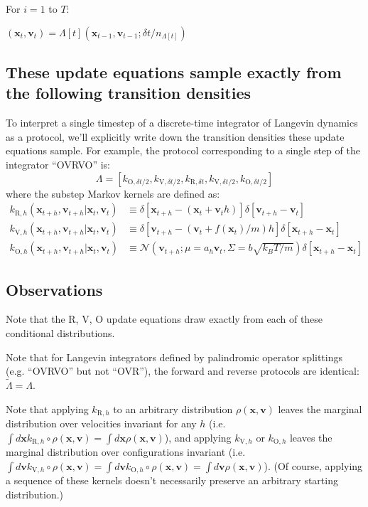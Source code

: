 \documentclass[11pt]{article}
\newcommand{\x}{\mathbf{x}}
\newcommand{\vel}{\mathbf{v}}
\begin{document}
For $i=1$ to $T$:

$(\x_t, \vel_t) = \Lambda[t](\x_{t-1}, \vel_{t-1} ; \delta t / n_{\Lambda[t]}) $

\subsection{These update equations sample exactly from the following transition densities}
To interpret a single timestep of a discrete-time integrator of Langevin dynamics as a protocol, we'll explicitly write down the transition densities these update equations sample.
For example, the protocol corresponding to a single step of the integrator ``OVRVO'' is:
$$\Lambda = [k_{\text{O}, \delta t / 2},
k_{\text{V}, \delta t / 2},
k_{\text{R}, \delta t},
k_{\text{V}, \delta t / 2},
k_{\text{O}, \delta t / 2}]$$
where the substep Markov kernels are defined as:
$$\begin{aligned}
k_{\text{R}, h}(\x_{t+h}, \vel_{t+h} | \x_t, \vel_t) &\equiv  \delta[ \x_{t+h} - (\x_t + \vel_t h)] \delta [\vel_{t+h} - \vel_t]\\
k_{\text{V}, h}(\x_{t+h}, \vel_{t+h} | \x_t, \vel_t) &\equiv  \delta[ \vel_{t+h} - (\vel_t + f(\x_t) / m) h] \delta [\x_{t+h} - \x_t]\\
k_{\text{O}, h}(\x_{t+h}, \vel_{t+h} | \x_t, \vel_t) &\equiv  \mathcal{N}(\vel_{t+h} ; \mu=a_h \vel_t, \Sigma=b \sqrt{k_B T / m}) \delta [\x_{t+h} - \x_t]
\end{aligned} $$

\subsection{Observations}
Note that the R, V, O update equations draw exactly from each of these conditional distributions.

Note that for Langevin integrators defined by palindromic operator splittings (e.g. ``OVRVO'' but not ``OVR''), the forward and reverse protocols are identical: $\tilde{\Lambda} = \Lambda$.

Note that applying $k_{\text{R}, h}$ to an arbitrary distribution $\rho(\x, \vel)$ leaves the marginal distribution over velocities invariant for any $h$ (i.e. $\int d \x k_{\text{R}, h} \circ \rho(\x, \vel) = \int d \x \rho(\x, \vel)$), and applying $k_{\text{V}, h}$ or $k_{\text{O}, h}$ leaves the marginal distribution over configurations invariant (i.e. $\int d \vel k_{\text{V}, h} \circ \rho(\x, \vel) = \int d \vel k_{\text{O}, h} \circ \rho(\x, \vel) = \int d \vel \rho(\x, \vel)$).
(Of course, applying a sequence of these kernels doesn't necessarily preserve an arbitrary starting distribution.)
\end{document}
